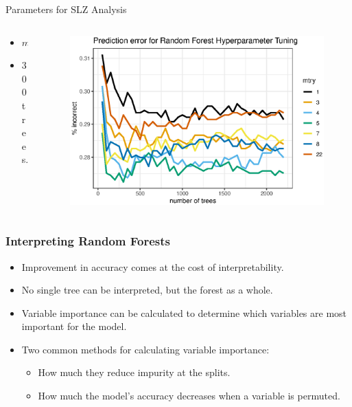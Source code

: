 \documentclass[professionalfonts]{beamer}
\begin{document}
\begin{frame}{Parameters for SLZ Analysis}
  \begin{columns}
    \begin{column}{0.2\linewidth}
      \begin{itemize}
        \item $mtry = 5$
        \item 300 trees.
      \end{itemize}
    \end{column}
    \begin{column}{0.80\linewidth}
      \begin{figure}
        \centering
        \includegraphics[width=\textwidth]{images/RandomForest/tree_num_dur.eps}
      \end{figure}
    \end{column}  
  \end{columns}
\end{frame}

\begin{frame}
  \frametitle{Interpreting Random Forests}
  \begin{itemize}
    \item Improvement in accuracy comes at the cost of interpretability.
    \item No single tree can be interpreted, but the forest as a whole.
    \item Variable importance can be calculated to determine which variables are most important for the model.
    \item Two common methods for calculating variable importance:
    \begin{itemize}
      \item How much they reduce impurity at the splits.
      \item How much the model's accuracy decreases when a variable is permuted.
    \end{itemize}
  \end{itemize}
\end{frame}
\end{document}
